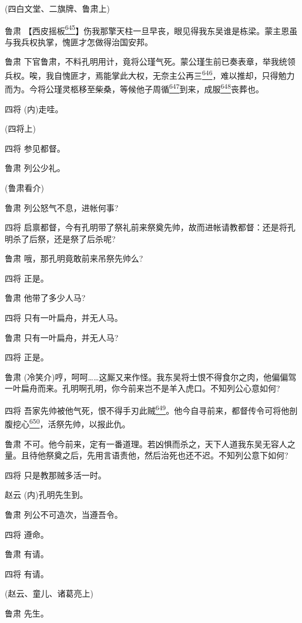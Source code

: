 (四白文堂、二旗牌、鲁肃上)

鲁肃
【西皮摇板\protect\hyperlink{fn645}{\textsuperscript{645}}】伤我那擎天柱一旦早丧，眼见得我东吴谁是栋梁。蒙主恩虽与我兵权执掌，愧匪才怎做得治国安邦。

鲁肃
下官鲁肃，不料孔明用计，竟将公瑾气死。蒙公瑾生前已奏表章，举我统领兵权。唉，我自愧匪才，焉能掌此大权，无奈主公再三\protect\hyperlink{fn646}{\textsuperscript{646}}，难以推却，只得勉力而为。今将公瑾灵柩移至柴桑，等候他子周循\protect\hyperlink{fn647}{\textsuperscript{647}}到来，成服\protect\hyperlink{fn648}{\textsuperscript{648}}丧葬也。

四将 (内)走哇。

(四将上)

四将 参见都督。

鲁肃 列公少礼。

(鲁肃看介)

鲁肃 列公怒气不息，进帐何事?

四将
启禀都督，今有孔明带了祭礼前来祭奠先帅，故而进帐请教都督：还是将孔明杀了后祭，还是祭了后杀呢?

鲁肃 哦，那孔明竟敢前来吊祭先帅么?

四将 正是。

鲁肃 他带了多少人马?

四将 只有一叶扁舟，并无人马。

鲁肃 只有一叶扁舟，并无人马?

四将 正是。

鲁肃
(冷笑介)哼，呵呵\ldots{}\ldots{}这厮又来作怪。我东吴将士恨不得食尔之肉，他偏偏驾一叶扁舟而来。孔明啊孔明，你今前来岂不是羊入虎口。不知列公心意如何?

四将
吾家先帅被他气死，恨不得手刃此贼\protect\hyperlink{fn649}{\textsuperscript{649}}。他今自寻前来，都督传令可将他剖腹挖心\protect\hyperlink{fn650}{\textsuperscript{650}}，活祭先帅，以报此仇。

鲁肃
不可。他今前来，定有一番道理。若凶惧而杀之，天下人道我东吴无容人之量。且待他祭奠之后，先用言语责他，然后治死也还不迟。不知列公意下如何?

四将 只是教那贼多活一时。

赵云 (内)孔明先生到。

鲁肃 列公不可造次，当遵吾令。

四将 遵命。

鲁肃 有请。

四将 有请。

(赵云、童儿、诸葛亮上)

鲁肃 先生。

